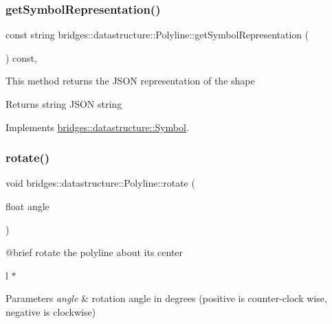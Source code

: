 \subsubsection{\texorpdfstring{getSymbolRepresentation()}{getSymbolRepresentation()}}
{\footnotesize\ttfamily const string bridges\+::datastructure\+::\+Polyline\+::get\+Symbol\+Representation (\begin{DoxyParamCaption}{ }\end{DoxyParamCaption}) const\hspace{0.3cm}{\ttfamily [inline]}, {\ttfamily [virtual]}}

This method returns the J\+S\+ON representation of the shape

\begin{DoxyReturn}{Returns}
string J\+S\+ON string 
\end{DoxyReturn}


Implements \mbox{\hyperlink{classbridges_1_1datastructure_1_1_symbol_a8044b3da559dcd9de8510ae339f126c8}{bridges\+::datastructure\+::\+Symbol}}.

\mbox{\label{classbridges_1_1datastructure_1_1_polyline_aa61978ccbb0b086dc8f55e90ccca23c9}} 
\subsubsection{\texorpdfstring{rotate()}{rotate()}}
{\footnotesize\ttfamily void bridges\+::datastructure\+::\+Polyline\+::rotate (\begin{DoxyParamCaption}\item[{float}]{angle }\end{DoxyParamCaption})\hspace{0.3cm}{\ttfamily [inline]}}

\begin{DoxyVerb}@brief rotate the polyline about its center
\end{DoxyVerb}
 l $\ast$ 
\begin{DoxyParams}{Parameters}
{\em angle} & rotation angle in degrees (positive is counter-\/clock wise, negative is clockwise) \\
\hline
\end{DoxyParams}
\mbox{\label{classbridges_1_1datastructure_1_1_polyline_adf06f484d9a48960de84ed3646903f3a}} 
